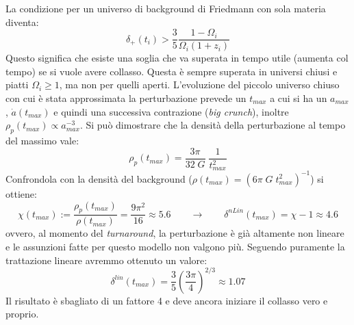 La condizione per un universo di background di Friedmann con sola materia diventa:
$$
\delta_+ (t_i) > \frac{3}{5}\frac{1-\Omega_i}{\Omega_i (1+z_i)}
$$
Questo significa che esiste una soglia che va superata in tempo utile (aumenta col tempo) se si vuole avere collasso. Questa è sempre superata in universi chiusi e piatti $\Omega_i \geq 1$, ma non per quelli aperti. L'evoluzione del piccolo universo chiuso con cui è stata approssimata la perturbazione prevede un $t_{max}$ a cui si ha un $a_{max}$, $\dot{a}(t_{max})$ e quindi una successiva contrazione (\textit{big crunch}), inoltre $\rho_p (t_{max})\propto a_{max}^{-3}$. Si può dimostrare che la densità della perturbazione al tempo del massimo vale:
\begin{equation}
    \rho_p (t_{max})=\frac{3\pi }{32\; G} \; \frac{1}{t_{max}^2}
\end{equation}
Confrondola con la densità del background ($\rho(t_{max})=(6\pi \; G \; t_{max}^2)^{-1}$) si ottiene:
$$
\chi (t_{max}):= \frac{\rho_p(t_{max})}{\rho (t_{max})}= \frac{9\pi^2}{16}\approx 5.6 \qquad \rightarrow\qquad \delta^{nLin} (t_{max})= \chi -1 \approx 4.6
$$
ovvero, al momento del \textit{turnaround}, la perturbazione è già altamente non lineare e le assunzioni fatte per questo modello non valgono più. Seguendo puramente la trattazione lineare avremmo ottenuto un valore:
$$
\delta^{lin}(t_{max})=\frac{3}{5} \left(\frac{3\pi}{4}\right)^{2/3}\approx 1.07
$$
Il risultato è sbagliato di un fattore 4 e deve ancora iniziare il collasso vero e proprio.



